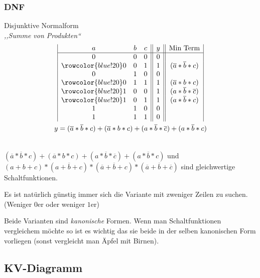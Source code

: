 \documentclass{article}
\begin{document}
\begin{minipage}{.50\linewidth}
    \subsubsection{DNF}
    Disjunktive Normalform \\
    \emph{,,Summe von Produkten``}
    \begin{gather*}
        \begin{array}{|c c c || c || c |}
            a & b & c & y   & \text{Min Term} \\
            \hline 
            0 & 0 & 0 & 0 &  \\
            \rowcolor{blue!20} 0 & 0 & 1 & 1  & (\overline{a}*\overline{b}*c)  \\
            0 & 1 & 0 & 0  & \\
            \rowcolor{blue!20} 0 & 1 & 1 & 1   & (\overline{a}*b*c)  \\
            \rowcolor{blue!20} 1 & 0 & 0 & 1  & (a*\overline{b}*\overline{c})  \\ 
            \rowcolor{blue!20}  1 & 0& 1 & 1 & (a*\overline{b}*c)   \\ 
            1 & 1 & 0 & 0 & \\
            1 & 1 & 1 &  0 & \\
        \end{array} \\
        y=(\overline{a}*\overline{b}*c) +  (\overline{a}*b*c) + (a*\overline{b}*\overline{c}) + (a*\overline{b}*c)
        \end{gather*}
\end{minipage} \\

$(\overline{a}*\overline{b}*c) +  (\overline{a}*b*c) + (a*\overline{b}*\overline{c}) + (a*\overline{b}*c)$ und $(a+b+c)*(a+\overline{b}+c)* (\overline{a}+\overline{b}+c) *  (\overline{a}+\overline{b}+\overline{c})$
sind gleichwertige Schaltfunktionen.

\begin{info}
   Es ist natürlich günstig immer sich die Variante mit zweniger Zeilen zu suchen. (Weniger $0$er oder weniger $1$er)
\end{info}

Beide Varianten sind \emph{kanonische} Formen. Wenn man Schaltfunktionen vergleichem möchte so ist es wichtig das sie beide in der 
selben kanonischen Form vorliegen (sonst vergleicht man Äpfel mit Birnen).




\subsection{KV-Diagramm}
\end{document}
